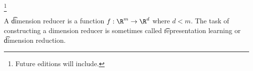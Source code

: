 
\footnote{Future editions will include.}



A \t{dimension reducer} is a function $f: \R^m \to \R^d$ where $d < m$.
The task of constructing a dimension reducer is sometimes called \t{representation learning} or \t{dimension reduction}.

\blankpage
